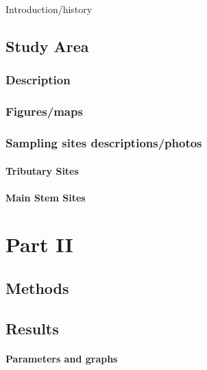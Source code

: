\documentclass[
]{book}
\begin{document}
Introduction/history

\hypertarget{study-area}{%
\chapter{Study Area}\label{study-area}}

\hypertarget{description}{%
\section{Description}\label{description}}

\hypertarget{figuresmaps}{%
\section{Figures/maps}\label{figuresmaps}}

\hypertarget{sampling-sites-descriptionsphotos}{%
\section{Sampling sites descriptions/photos}\label{sampling-sites-descriptionsphotos}}

\hypertarget{tributary-sites}{%
\subsection{Tributary Sites}\label{tributary-sites}}

\hypertarget{main-stem-sites}{%
\subsection{Main Stem Sites}\label{main-stem-sites}}

\hypertarget{part-part-ii}{%
\part{Part II}\label{part-part-ii}}

\hypertarget{methods}{%
\chapter{Methods}\label{methods}}

\hypertarget{results}{%
\chapter{Results}\label{results}}

\hypertarget{parameters-and-graphs}{%
\subsection{Parameters and graphs}\label{parameters-and-graphs}}
\end{document}

